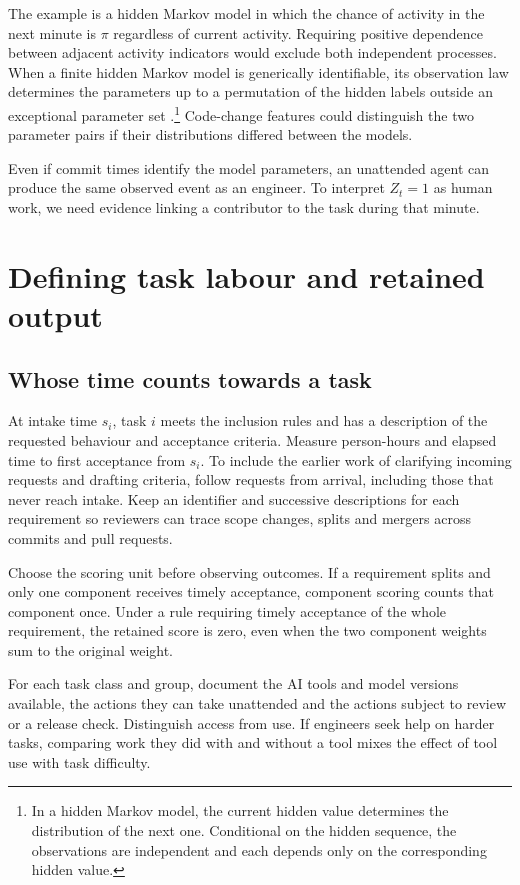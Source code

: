 \documentclass[11pt,a4paper]{amsart}
\begin{document}
The example is a hidden Markov model in which the chance of activity in the next minute is $\pi$ regardless of current activity. Requiring positive dependence between adjacent activity indicators would exclude both independent processes. When a finite hidden Markov model is generically identifiable, its observation law determines the parameters up to a permutation of the hidden labels outside an exceptional parameter set \cite[Section~6.1]{allman2009}.\footnote{In a hidden Markov model, the current hidden value determines the distribution of the next one. Conditional on the hidden sequence, the observations are independent and each depends only on the corresponding hidden value.} Code-change features could distinguish the two parameter pairs if their distributions differed between the models.

Even if commit times identify the model parameters, an unattended agent can produce the same observed event as an engineer. To interpret $Z_t=1$ as human work, we need evidence linking a contributor to the task during that minute.

\section{Defining task labour and retained output}
\label{sec:accounting}

\subsection{Whose time counts towards a task}

At intake time $s_i$, task $i$ meets the inclusion rules and has a description of the requested behaviour and acceptance criteria. Measure person-hours and elapsed time to first acceptance from $s_i$. To include the earlier work of clarifying incoming requests and drafting criteria, follow requests from arrival, including those that never reach intake. Keep an identifier and successive descriptions for each requirement so reviewers can trace scope changes, splits and mergers across commits and pull requests.

Choose the scoring unit before observing outcomes. If a requirement splits and only one component receives timely acceptance, component scoring counts that component once. Under a rule requiring timely acceptance of the whole requirement, the retained score is zero, even when the two component weights sum to the original weight.

For each task class and group, document the AI tools and model versions available, the actions they can take unattended and the actions subject to review or a release check. Distinguish access from use. If engineers seek help on harder tasks, comparing work they did with and without a tool mixes the effect of tool use with task difficulty.
\end{document}
